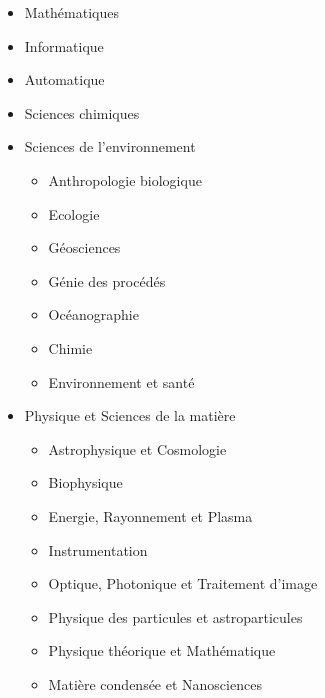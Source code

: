 	\label{ed-184-mathematiques-et-informatique}

		\begin{itemize}
		\item Mathématiques
		\item Informatique
		\item Automatique
		\end{itemize}

	\label{ed-250-sciences-chimiques-de-marseille}

		\begin{itemize}
		\item Sciences chimiques
		\end{itemize}

	\label{ed-251-sciences-de-lenvironnement}

		\begin{itemize}
		\item Sciences de l'environnement
			\begin{itemize}
			\item Anthropologie biologique
			\item Ecologie
			\item Géosciences 
			\item Génie des procédés
			\item Océanographie
			\item Chimie 
			\item Environnement et santé 
			\end{itemize}
		\end{itemize}

	\label{ed-352-physique-et-sciences-de-la-matiere}

		\begin{itemize}
		\item Physique et Sciences de la matière 
			\begin{itemize}
			\item Astrophysique et Cosmologie
			\item Biophysique
			\item Energie, Rayonnement et Plasma
			\item Instrumentation
			\item Optique, Photonique et Traitement d'image
			\item Physique des particules et astroparticules
			\item Physique théorique et Mathématique
			\item Matière condensée et Nanosciences 
			\end{itemize}
		\end{itemize}


